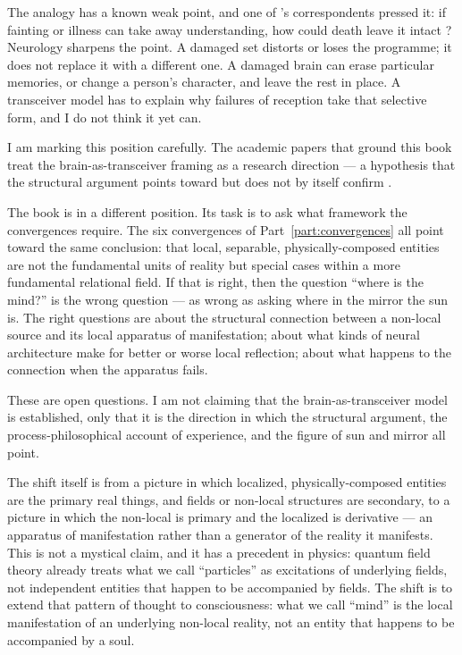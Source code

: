 The analogy has a known weak point, and one of \Bahaullah's correspondents
pressed it: if fainting or illness can take away understanding, how could death
leave it intact \citep{GleaningsBahaullah}? Neurology sharpens the point. A
damaged set distorts or loses the programme; it does not replace it with a
different one. A damaged brain can erase particular memories, or change a
person's character, and leave the rest in place. A transceiver model has to
explain why failures of reception take that selective form, and I do not think
it yet can.

I am marking this position carefully. The academic papers that ground this book
treat the brain-as-transceiver framing as a research direction --- a hypothesis
that the structural argument points toward but does not by itself confirm
\citep{AdamsThreePaths,AdamsMahabbat}.

The book is in a different position. Its task is to ask what framework the
convergences require. The six convergences of Part~\ref{part:convergences}
all point toward the same conclusion: that local, separable, physically-composed
entities are not the fundamental units of reality but special cases within a
more fundamental relational field. If that is right, then the question ``where
is the mind?'' is the wrong question --- as wrong as asking where in the mirror
the sun is. The right questions are about the structural connection between a
non-local source and its local apparatus of manifestation; about what kinds of
neural architecture make for better or worse local reflection; about what
happens to the connection when the apparatus fails.

These are open questions. I am not claiming that the brain-as-transceiver model
is established, only that it is the direction in which the structural argument,
the process-philosophical account of experience, and the \bahai figure of sun
and mirror all point.

The shift itself is from a picture in which localized, physically-composed
entities are the primary real things, and fields or non-local structures are
secondary, to a picture in which the non-local is primary and the localized is
derivative --- an apparatus of manifestation rather than a generator of the
reality it manifests. This is not a mystical claim, and it has a precedent in
physics: quantum field theory already treats what we call ``particles'' as
excitations of underlying fields, not independent entities that happen to be
accompanied by fields. The shift is to extend that pattern of thought to
consciousness: what we call ``mind'' is the local manifestation of an
underlying non-local reality, not an entity that happens to be accompanied by a
soul.

